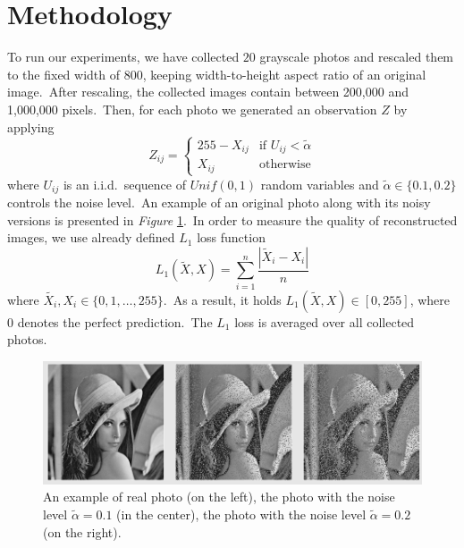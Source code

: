 \documentclass[shortabstract, english, lic]{iithesis}
\theoremstyle{default_theorem_style}\newtheorem{theorem}{Theorem}
\theoremstyle{default_theorem_style}\newtheorem{definition}{Definition}
\begin{document}
\section{Methodology}

To run our experiments, we have collected $20$ grayscale photos and rescaled them to the fixed width of $800$,
keeping width-to-height aspect ratio of an original image.\ After rescaling, the collected images contain between
200,000 and 1,000,000 pixels.\ Then, for each photo we generated an observation $Z$ by applying
$$
Z_{ij} =
\begin{cases}
  255 - X_{ij} &\text{if $U_{ij} < \tilde{\alpha}$}\\
  X_{ij} &\text{otherwise}
\end{cases}
$$
where $U_{ij}$ is an i.i.d.\ sequence of $Unif(0, 1)$ random variables and $\tilde{\alpha} \in \{0.1, 0.2\}$ controls
the noise level.\ An example of an original photo along with its noisy versions is presented
in \textit{Figure} \ref{fig:grayscale_data_examples}.\ In order to measure the quality of reconstructed images,
we use already defined $L_1$ loss function
$$
L_1(\tilde{X}, X) = \sum\limits_{i = 1}^n \frac{|\tilde{X}_i - X_i|}{n}
$$
where $\tilde{X_i}, X_i \in \{0, 1,  \dots, 255\}$.\ As a result, it holds $L_1(\tilde{X}, X) \in [0,255]$, where 0
denotes the perfect prediction.\ The $L_1$ loss is averaged over all collected
photos.\newline\newline\newline\newline\newline

\begin{figure}[H]
\centering
\includegraphics[scale=0.43]{grayscale_data_examples}
\caption{An example of real photo (on the left), the photo with the noise level $\tilde{\alpha} = 0.1$
(in the center), the photo with the noise level $\tilde{\alpha} = 0.2$ (on the right).}
\label{fig:grayscale_data_examples}
\end{figure}
\end{document}

